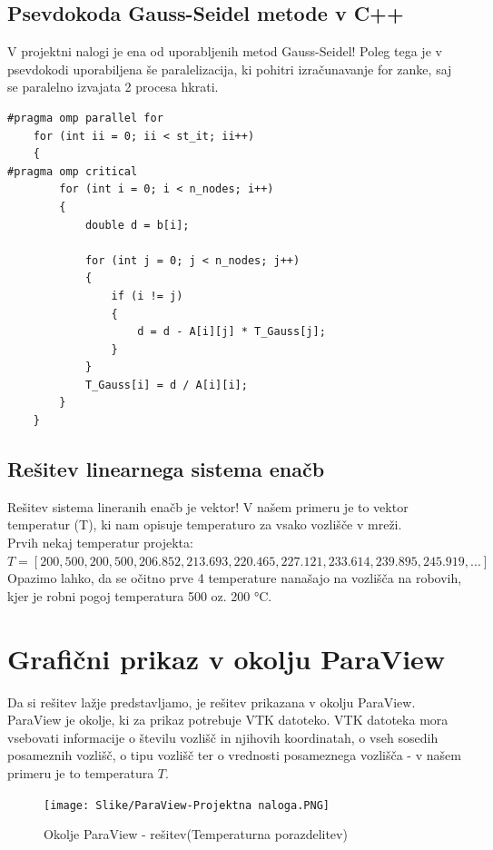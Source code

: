\documentclass[a4paper,12pt]{article}
\begin{document}
\subsection{Psevdokoda Gauss-Seidel metode v C++}

V projektni nalogi je ena od uporabljenih metod Gauss-Seidel! Poleg tega je v psevdokodi uporabiljena še paralelizacija, ki pohitri izračunavanje for zanke, saj se paralelno izvajata 2 procesa hkrati.
\begin{lstlisting}[caption={Psevdokoda Gauss-Seidel}, label=lst:algorithm]
#pragma omp parallel for
	for (int ii = 0; ii < st_it; ii++)
	{
#pragma omp critical
		for (int i = 0; i < n_nodes; i++)
		{
			double d = b[i];
   
			for (int j = 0; j < n_nodes; j++)
			{
				if (i != j)
				{
				    d = d - A[i][j] * T_Gauss[j];
				}
			}
			T_Gauss[i] = d / A[i][i];
		}
	}
\end{lstlisting}

\subsection{Rešitev linearnega sistema enačb}

Rešitev sistema lineranih enačb je vektor! V našem primeru je to vektor temperatur (T), ki nam opisuje temperaturo za vsako vozlišče v mreži.\medskip\\
Prvih nekaj temperatur projekta:\\
$T = {[200,500,200,500,206.852,213.693,220.465,227.121,233.614,239.895,245.919,...]}$\medskip\\ 
Opazimo lahko, da se očitno prve 4 temperature nanašajo na vozlišča na robovih, kjer je robni pogoj temperatura 500 oz. 200 °C.

\section{Grafični prikaz v okolju ParaView}

Da si rešitev lažje predstavljamo, je rešitev prikazana v okolju ParaView. ParaView je okolje, ki za prikaz potrebuje VTK datoteko. VTK datoteka mora vsebovati informacije o številu vozlišč in njihovih koordinatah, o vseh sosedih posameznih vozlišč, o tipu vozlišč ter o vrednosti posameznega vozlišča - v našem primeru je to temperatura $T$.

\begin{figure}[h]
    \centering
    \texttt{[image: Slike/ParaView-Projektna naloga.PNG]}
    \caption{Okolje ParaView - rešitev(Temperaturna porazdelitev)}
    \label{fig:ParaView}
\end{figure}
\end{document}

